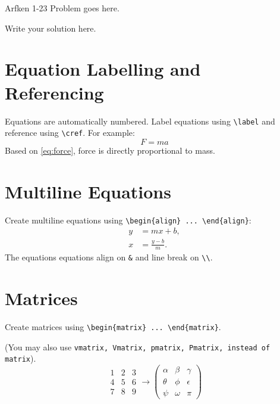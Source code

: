 
\begin{problem}{Arfken 1-23}
    Problem goes here.
\end{problem}

\begin{solution}
    Write your solution here.

    \section{Equation Labelling and Referencing}
    Equations are automatically numbered. Label equations using \verb|\label| and reference using \verb|\cref|. For example:
    \begin{equation} \label{eq:force}
        F = ma
    \end{equation}
    Based on \cref{eq:force}, force is directly proportional to mass.

    \section{Multiline Equations}
    Create multiline equations using \verb|\begin{align} ... \end{align}|:
    \begin{align}
        y &= mx + b, \\ 
        x &= \frac{y-b}{m}.
    \end{align}
    The equations equations align on \verb|&| and line break on \verb|\\|.

    \section{Matrices}
    Create matrices using \verb|\begin{matrix} ... \end{matrix}|. 
    
    (You may also use \texttt{vmatrix, Vmatrix, pmatrix, Pmatrix, instead of matrix}).
    \begin{equation}
    \begin{matrix}
        1 & 2 & 3 \\
        4 & 5 & 6 \\
        7 & 8 & 9
    \end{matrix}
    \to
    \begin{pmatrix}
        \alpha & \beta & \gamma \\
        \theta & \phi & \epsilon \\
        \psi & \omega & \pi
    \end{pmatrix}
    \end{equation}
\end{solution}
